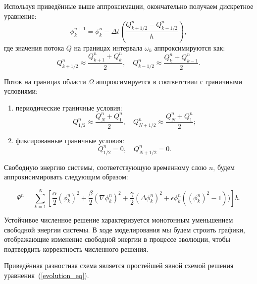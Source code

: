 Используя приведённые выше аппроксимации, окончательно получаем дискретное уравнение:
\begin{equation*}
    \phi^{n+1}_k = \phi^n_k - \Delta t \left( \frac{Q_{k+1/2}^n - Q_{k-1/2}^n}{h} \right),
\end{equation*}
где значения потока \( Q \) на границах интервала \( \omega_k \) аппроксимируются как:
\begin{equation*}
    Q_{k+1/2}^n \approx \frac{Q_{k+1}^n + Q_k^n}{2}, \quad Q_{k-1/2}^n \approx \frac{Q_k^n + Q_{k-1}^n}{2}.
\end{equation*}

Поток на границах области $\Omega$ аппроксимируется в соответствии с граничными условиями:
\begin{enumerate}
    \item периодические граничные условия:
    \begin{equation*}
        Q_{1/2}^n \approx \frac{Q_{N}^n + Q_1^n}{2}, \quad Q_{N+1/2}^n \approx \frac{Q_{N}^n + Q_{1}^n}{2};
    \end{equation*}
    \item фиксированные граничные условия:
    \begin{equation*}
        Q_{1/2}^n = 0, \quad Q_{N+1/2}^n = 0.
    \end{equation*}
\end{enumerate}

Свободную энергию системы, соответствующую временному слою $n$, будем аппрокисимировать следующим образом:

\begin{equation*} 
\Psi^n = \sum\limits^{N}_{k=1} \left[ \frac{\alpha}{2}(\phi_k^n)^2 + \frac{\beta}{2}(\nabla \phi_k^n)^2 + \frac{\gamma}{2}(\Delta \phi_k^n)^2 +  \epsilon {\phi_k^n} ({(\phi_k^n)}^2 - 1)) \right] h.
\end{equation*}

Устойчивое численное решение характеризуется монотонным уменьшением свободной энергии системы. В ходе моделирования мы будем строить графики, отображающие изменение свободной энергии в процессе эволюции, чтобы подтвердить корректность численного решения.

Приведённая разностная схема является простейшей явной схемой решения уравнения~({\ref{evolution_eq}}). 
